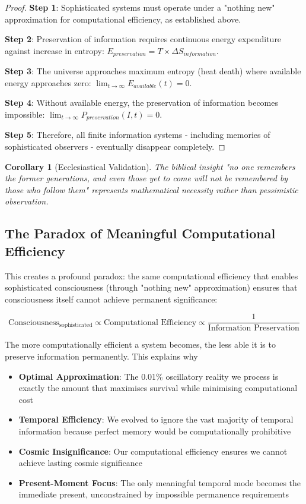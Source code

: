 \documentclass[11pt]{article}
\newtheorem{corollary}[theorem]{Corollary}
\theoremstyle{remark}
\begin{document}
\begin{proof}
\textbf{Step 1}: Sophisticated systems must operate under a "nothing new" approximation for computational efficiency, as established above.

\textbf{Step 2}: Preservation of information requires continuous energy expenditure against increase in entropy: $E_{preservation} = T \times \Delta S_{information}$.

\textbf{Step 3}: The universe approaches maximum entropy (heat death) where available energy approaches zero: $\lim_{t \to \infty} E_{available}(t) = 0$.

\textbf{Step 4}: Without available energy, the preservation of information becomes impossible: $\lim_{t \to \infty} P_{preservation}(I,t) = 0$.

\textbf{Step 5}: Therefore, all finite information systems - including memories of sophisticated observers - eventually disappear completely.
\end{proof}

\begin{corollary}[Ecclesiastical Validation]
The biblical insight "no one remembers the former generations, and even those yet to come will not be remembered by those who follow them" represents mathematical necessity rather than pessimistic observation.
\end{corollary}

\subsection{The Paradox of Meaningful Computational Efficiency}

This creates a profound paradox: the same computational efficiency that enables sophisticated consciousness (through "nothing new" approximation) ensures that consciousness itself cannot achieve permanent significance:

$$\text{Consciousness}_{\text{sophisticated}} \propto \text{Computational Efficiency} \propto \frac{1}{\text{Information Preservation}}$$

The more computationally efficient a system becomes, the less able it is to preserve information permanently. This explains why

\begin{itemize}
\item \textbf{Optimal Approximation}: The 0.01\% oscillatory reality we process is exactly the amount that maximises survival while minimising computational cost
\item \textbf{Temporal Efficiency}: We evolved to ignore the vast majority of temporal information because perfect memory would be computationally prohibitive
\item \textbf{Cosmic Insignificance}: Our computational efficiency ensures we cannot achieve lasting cosmic significance
\item \textbf{Present-Moment Focus}: The only meaningful temporal mode becomes the immediate present, unconstrained by impossible permanence requirements
\end{itemize}
\end{document}
